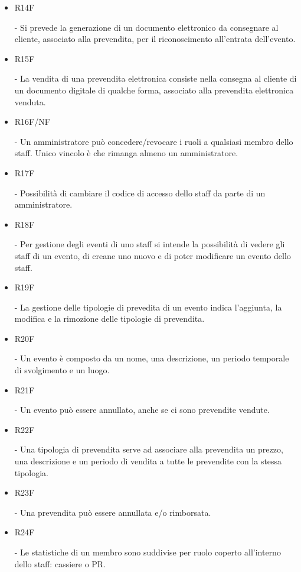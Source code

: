 \documentclass[a4paper]{article}
\begin{document}
\begin{itemize}
	\item \hypertarget{R14F}{R14F} - Si prevede la generazione di un documento elettronico da consegnare al cliente, associato alla prevendita, per il riconoscimento all'entrata dell'evento.
	
	\item \hypertarget{R15F}{R15F} - La vendita di una prevendita elettronica consiste nella consegna al cliente di un documento digitale di qualche forma, associato alla prevendita elettronica venduta.
	
	\item \hypertarget{R16F/NF}{R16F/NF} - Un amministratore può concedere/revocare i ruoli a qualsiasi membro dello staff. Unico vincolo è che rimanga almeno un amministratore.
	\item \hypertarget{R17F}{R17F} - Possibilità di cambiare il codice di accesso dello staff da parte di un amministratore.
	   
	\item \hypertarget{R18F}{R18F} - Per gestione degli eventi di uno staff si intende la possibilità di vedere gli staff di un evento, di creane uno nuovo e di poter modificare un evento dello staff.
		
	\item \hypertarget{R19F}{R19F} - La gestione delle tipologie di prevedita di un evento indica l'aggiunta, la modifica e la rimozione delle tipologie di prevendita.
	
	\item \hypertarget{R20F}{R20F} - Un evento è composto da un nome, una descrizione, un periodo temporale di svolgimento e un luogo. 
	\item \hypertarget{R21F}{R21F} - Un evento può essere annullato, anche se ci sono prevendite vendute.
	
	\item \hypertarget{R22F}{R22F} - Una tipologia di prevendita serve ad associare alla prevendita un prezzo, una descrizione e un periodo di vendita a tutte le prevendite con la stessa tipologia.

	\item \hypertarget{R23F}{R23F} - Una prevendita può essere annullata e/o rimborsata. 
	
	\item \hypertarget{R24F}{R24F} - Le statistiche di un membro sono suddivise per ruolo coperto all'interno dello staff: cassiere o PR.
	

\end{itemize}
\end{document}
